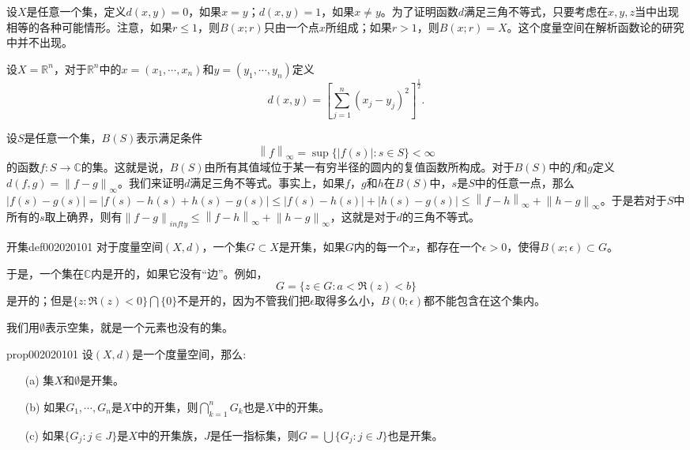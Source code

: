 \begin{example}\label{exam002020105}
设$X$是任意一个集，定义$d(x, y) = 0$，如果$x=y$；$d(x, y)=1$，如果$x \neq y$。为了证明函数$d$满足三角不等式，只要考虑在$x,y,z$当中出现相等的各种可能情形。注意，如果$r \le 1$，则$B(x; r)$只由一个点$x$所组成；如果$r > 1$，则$B(x;r) = X$。这个度量空间在解析函数论的研究中并不出现。
\end{example}

\begin{example}\label{exam002020106}
设$X = \mathbb{R}^n$，对于$\mathbb{R}^n$中的$x=(x_1,\cdots, x_n)$和$y=(y_1,\cdots,y_n)$定义
\[
d(x, y) = [\sum_{j=1}^{n}{(x_j-y_j)^2}]^{\frac{1}{2}}.
\]
\end{example}

\begin{example}\label{exam002020107}
设$S$是任意一个集，$B(S)$表示满足条件
\[
\left\|f\right\|_{\infty} = \sup{\{\left|f(s)\right|: s \in S\}} < \infty
\]
的函数$f: S \to \mathbb{C}$的集。这就是说，$B(S)$由所有其值域位于某一有穷半径的圆内的复值函数所构成。对于$B(S)$中的$f$和$g$定义$d(f, g) = \left\|f-g\right\|_{\infty}$。我们来证明$d$满足三角不等式。事实上，如果$f$，$g$和$h$在$B(S)$中，$s$是$S$中的任意一点，那么$|f(s)-g(s)| = |f(s)-h(s)+h(s)-g(s)| \le |f(s)-h(s)| + |h(s)-g(s)| \le \left\|f-h\right\|_{\infty} + \left\|h - g\right\|_{\infty}$。于是若对于$S$中所有的$s$取上确界，则有$\left\|f-g\right\|_{infty} \le \left\|f-h\right\|_{\infty} + \left\|h - g\right\|_{\infty}$，这就是对于$d$的三角不等式。
\end{example}

\begin{definition}{开集}{def002020101}
对于度量空间$(X, d)$，一个集$G \subset X$是开集，如果$G$内的每一个$x$，都存在一个$\epsilon > 0$，使得$B(x;\epsilon) \subset G$。
\end{definition}

于是，一个集在$\mathbb{C}$内是开的，如果它没有“边”。例如，
\[
G = \{z \in G: a < \Re{(z)} < b\}
\]
是开的；但是$\{z: \Re{(z)} < 0\} \bigcap \{0\}$不是开的，因为不管我们把$\epsilon$取得多么小，$B(0;\epsilon)$都不能包含在这个集内。

我们用$\emptyset$表示空集，就是一个元素也没有的集。

\begin{proposition}{}{prop002020101}
设$(X, d)$是一个度量空间，那么:
\begin{enumerate}
\item[(a)]集$X$和$\emptyset$是开集。
\item[(b)]如果$G_1,\cdots, G_n$是$X$中的开集，则$\bigcap_{k=1}^{n}{G_k}$也是$X$中的开集。
\item[(c)]如果$\{G_j:j \in J\}$是$X$中的开集族，$J$是任一指标集，则$G = \bigcup\{G_j:j \in J\}$也是开集。
\end{enumerate}
\end{proposition}

